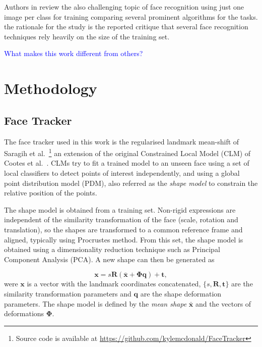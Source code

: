 \documentclass[]{article}
\begin{document}
Authors in \cite{Tan20061725} review the also challenging topic of face recognition using  just one image per
class for training comparing several prominent algorithms for the tasks. the rationale for the study is the reported
critique that several face recognition techniques rely heavily on the size of the training set.

\textcolor{blue}{What makes this work different from others?}


\section{Methodology}
\label{sec:methodology}

\subsection{Face Tracker}
\label{sec:face_tracker}

The face tracker used in this work is the regularised landmark
mean-shift of Saragih et
al.~\cite{saragih2011deformable}\footnote{Source code is available at \url{https://github.com/kylemcdonald/FaceTracker}} an
extension of the original Constrained Local Model (CLM) of Cootes et
al.~\cite{cristinacce2006feature}. CLMs try to fit
a trained model to an unseen face using a set of local classifiers to detect
points of interest independently, and using a global point
distribution model (PDM), also referred as the \textit{shape model} to
constrain the relative position of the points.

The shape model is obtained from a training set. Non-rigid expressions
are independent of the similarity transformation of the face (scale,
rotation and translation), so the shapes are transformed
to a common reference frame and aligned, typically using Procrustes
method. From this set, the shape model is obtained using a
dimensionality reduction technique such as Principal Component
Analysis (PCA). A new shape can then be generated as

\begin{equation}
  \label{eq:shape_model}
  \mathbf{x} = s\mathbf{R}(\bar{\mathbf{x}} +
  \boldsymbol{\Phi}\mathbf{q}) + \mathbf{t},
\end{equation}
were $\mathbf{x}$ is a vector with the landmark coordinates concatenated, 
$\{s,\mathbf{R},\mathbf{t}\}$ are the similarity transformation
parameters and $\mathbf{q}$ are the shape deformation parameters. The
shape model is defined by the \textit{mean shape} $\mathbf{\bar{x}}$
and the vectors of deformations $\boldsymbol{\Phi}$.
\end{document}
